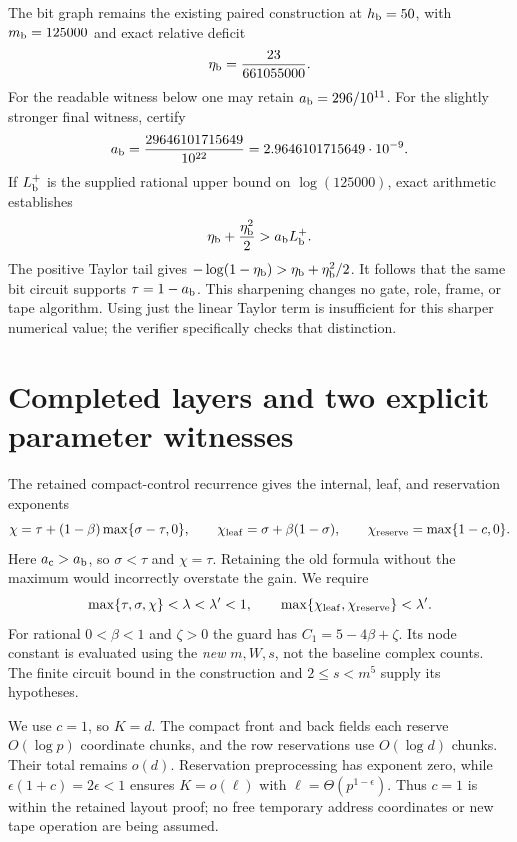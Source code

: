 \documentclass[11pt]{article}
\newcommand{\ab}{a_{\rm b}}
\newcommand{\ac}{a_{\rm c}}
\begin{document}
The bit graph remains the existing paired construction at $h_{\rm b}=50$,
with $m_{\rm b}=125000$ and exact relative deficit
\[
 \eta_{\rm b}=\frac{23}{661055000}.
\]
For the readable witness below one may retain $\ab=296/10^{11}$.
For the slightly stronger final witness, certify
\[
 \ab=\frac{29646101715649}{10^{22}}
      =2.9646101715649\cdot10^{-9}.
\]
If $L_{\rm b}^{+}$ is the supplied rational upper bound on
$\log(125000)$, exact arithmetic establishes
\[
 \eta_{\rm b}+\frac{\eta_{\rm b}^2}{2}
      >\ab L_{\rm b}^{+}.
\]
The positive Taylor tail gives
$-\log(1-\eta_{\rm b})>\eta_{\rm b}+\eta_{\rm b}^2/2$.
It follows that the same bit circuit supports $\tau=1-\ab$.
This sharpening changes no gate, role, frame, or tape algorithm.
Using just the linear Taylor term is insufficient for this sharper
numerical value; the verifier specifically checks that distinction.

\section{Completed layers and two explicit parameter witnesses}
The retained compact-control recurrence gives the internal, leaf, and
reservation exponents
\[
 \chi=\tau+(1-\beta)\max\{\sigma-\tau,0\},\qquad
 \chi_{\rm leaf}=\sigma+\beta(1-\sigma),\qquad
 \chi_{\rm reserve}=\max\{1-c,0\}.
\]
Here $\ac>\ab$, so $\sigma<\tau$ and $\chi=\tau$.  Retaining the
old formula without the maximum would incorrectly overstate the gain.
We require
\[
 \max\{\tau,\sigma,\chi\}<\lambda<\lambda'<1,
 \qquad
 \max\{\chi_{\rm leaf},\chi_{\rm reserve}\}<\lambda'.
\]
For rational $0<\beta<1$ and $\zeta>0$ the guard has
$C_1=5-4\beta+\zeta$.  Its node constant is evaluated using the
\emph{new} $m,W,s$, not the baseline complex counts.  The finite circuit
bound in the construction and $2\le s<m^5$ supply its hypotheses.

We use $c=1$, so $K=d$.  The compact front and back fields each reserve
$O(\log p)$ coordinate chunks, and the row reservations use $O(\log d)$
chunks.  Their total remains $o(d)$.  Reservation preprocessing has
exponent zero, while $\epsilon(1+c)=2\epsilon<1$ ensures
$K=o(\ell)$ with $\ell=\Theta(p^{1-\epsilon})$.  Thus $c=1$ is
within the retained layout proof; no free temporary address coordinates
or new tape operation are being assumed.
\end{document}
